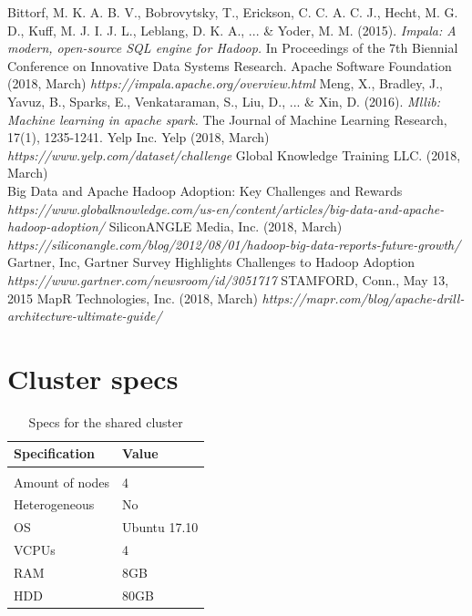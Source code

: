 \documentclass[a4paper,english]{report}
\begin{document}
\begin{thebibliography}{1}
		Bittorf, M. K. A. B. V., Bobrovytsky, T., Erickson, C. C. A. C. J., Hecht, M. G. D., Kuff, M. J. I. J. L., Leblang, D. K. A., ... \& Yoder, M. M. (2015). \emph{Impala: A modern, open-source SQL engine for Hadoop.} In Proceedings of the 7th Biennial Conference on Innovative Data Systems Research.
		Apache Software Foundation (2018, March) 
		\emph{https://impala.apache.org/overview.html}
		Meng, X., Bradley, J., Yavuz, B., Sparks, E., Venkataraman, S., Liu, D., ... \& Xin, D. (2016). \emph{Mllib: Machine learning in apache spark.} The Journal of Machine Learning Research, 17(1), 1235-1241.
		 Yelp Inc. Yelp (2018, March)
		\emph{https://www.yelp.com/dataset/challenge}
		 Global Knowledge Training LLC. (2018, March)\\
		 Big Data and Apache Hadoop Adoption: Key Challenges and Rewards
		\emph{https://www.globalknowledge.com/us-en/content/articles/big-data-and-apache-hadoop-adoption/}
		SiliconANGLE Media, Inc. (2018, March)
		\emph{https://siliconangle.com/blog/2012/08/01/hadoop-big-data-reports-future-growth/}
		Gartner, Inc, Gartner Survey Highlights Challenges to Hadoop Adoption
		\emph{https://www.gartner.com/newsroom/id/3051717} STAMFORD, Conn., May 13, 2015
		MapR Technologies, Inc. (2018, March)
		\emph{https://mapr.com/blog/apache-drill-architecture-ultimate-guide/}
	\end{thebibliography}

\appendix
\chapter{Cluster specs}
\begin{table}[H]
	\centering
	\caption{Specs for the shared cluster}
	\label{table:cluster_shared}
	\begin{tabular}{ll}
		\\
		\multicolumn{1}{l}{\bfseries Specification} & \multicolumn{1}{l}{\bfseries Value} \\ \hline \\
		Amount of nodes & 4  \\
		Heterogeneous & No  \\
		OS & Ubuntu 17.10  \\
		VCPUs & 4  \\
		RAM & 8GB  \\ 
		HDD & 80GB  \\
	\end{tabular}
\end{table}
\end{document}
